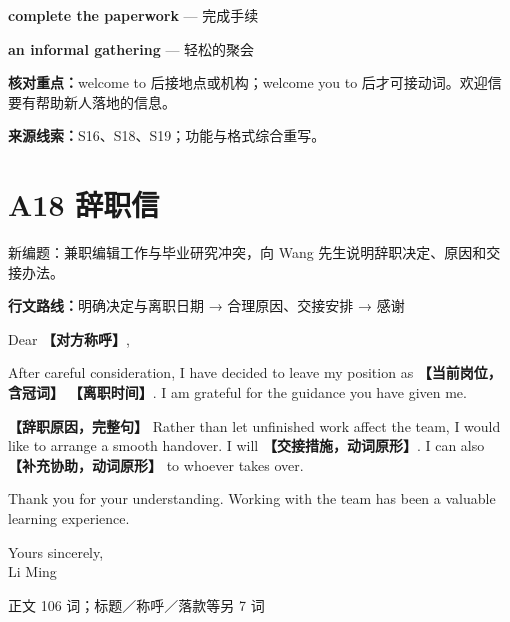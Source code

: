 \documentclass[11pt,a4paper,fontset=macnew]{ctexart}
\newenvironment{writing}{\begingroup\fontsize{10.5}{13.5}\selectfont\setlength{\parskip}{3pt}}{\par\endgroup}
\begin{document}
{\small\textbf{complete the paperwork} — 完成手续}\par
{\small\textbf{an informal gathering} — 轻松的聚会}\par
{\small\textbf{核对重点：}welcome to 后接地点或机构；welcome you to 后才可接动词。欢迎信要有帮助新人落地的信息。}\par
{\fontsize{8}{10}\selectfont\textbf{来源线索：}S16、S18、S19；功能与格式综合重写。}\par
\clearpage\section*{A18  辞职信}
{\small 新编题：兼职编辑工作与毕业研究冲突，向 Wang 先生说明辞职决定、原因和交接办法。}\par
{\small\textbf{行文路线：}明确决定与离职日期 → 合理原因、交接安排 → 感谢}\par
\par\vspace{4pt}{\bfseries 可替换模板}\par\nopagebreak
\begin{writing}
\noindent Dear {\bfseries 【对方称呼】},\par
After careful consideration, I have decided to leave my position as {\bfseries 【当前岗位，含冠词】} {\bfseries 【离职时间】}. I am grateful for the guidance you have given me.

{\bfseries 【辞职原因，完整句】} Rather than let unfinished work affect the team, I would like to arrange a smooth handover. I will {\bfseries 【交接措施，动词原形】}. I can also {\bfseries 【补充协助，动词原形】} to whoever takes over.

Thank you for your understanding. Working with the team has been a valuable learning experience.

\noindent Yours sincerely,\\Li Ming\par
\end{writing}
\par\vspace{4pt}{\bfseries 完整套用示例}\par\nopagebreak
{\small 正文 106 词；标题／称呼／落款等另 7 词}\par
\end{document}
